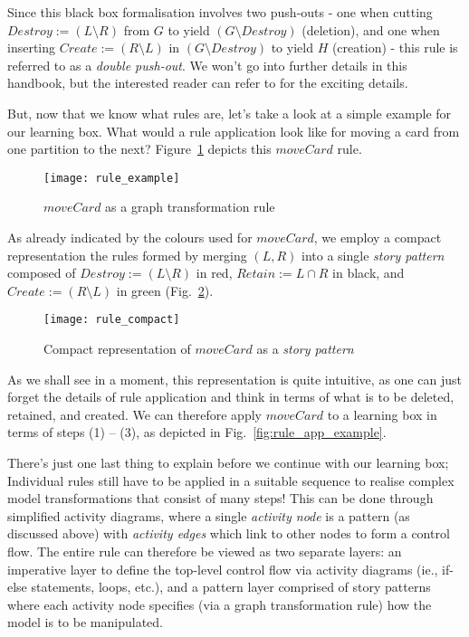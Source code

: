 Since this black box formalisation involves two push-outs - one when cutting $Destroy := (L\setminus R)$ from $G$ to yield $(G\setminus Destroy)$ (deletion),
and one when inserting $Create := (R\setminus L)$ in $(G\setminus Destroy)$ to yield $H$ (creation) - this rule is referred to as a \emph{double push-out}.
We won't go into further details in this handbook, but the interested reader can refer to \cite{EEPT06} for the exciting details.

But, now that we know what rules are, let's take a look at a simple example for our learning box. What would a rule application look like for moving a card from
one partition to the next? Figure~\ref{fig:rule_example} depicts this $moveCard$ rule.
  
\begin{figure}[htp]
\begin{center}
  \texttt{[image: rule\_example]}
  \caption[]{$moveCard$ as a graph transformation rule}	
  \label{fig:rule_example}
\end{center}
\end{figure}

\pagebreak

As already indicated by the colours used for $moveCard$, we employ a compact representation the rules formed by merging $(L,R)$ into a single \emph{story
pattern} composed of  $Destroy := (L\setminus R)$ in red, $Retain :=  L\cap R$ in black, and $Create := (R\setminus L)$ in green
(Fig.~\ref{fig:rule_compact}).

\begin{figure}[htp]
\begin{center}
  \texttt{[image: rule\_compact]}
  \caption[]{Compact representation of $moveCard$ as a \emph{story pattern}}
  \label{fig:rule_compact}
\end{center}
\end{figure}

As we shall see in a moment, this  representation is quite intuitive, as one can just forget the details of rule application and think in terms of what is to be
deleted, retained, and created. We can therefore apply $moveCard$ to a learning box in terms of steps (1) -- (3), as depicted in Fig.~\ref{fig:rule_app_example}.

There's just one last thing to explain before we continue with our learning box; Individual rules still have to be applied in a suitable sequence to realise
complex model transformations that consist of many steps! This can be done through simplified activity diagrams, where a single \emph{activity
node} is a pattern (as discussed above) with \emph{activity edges} which link to other nodes to form a control flow.
The entire rule can therefore be viewed as two separate layers: an imperative layer to define the top-level control flow via activity diagrams (ie., if-else
statements, loops, etc.), and a pattern layer comprised of story patterns where each activity node specifies (via a graph transformation rule) how the model is
to be manipulated.
\pagebreak

